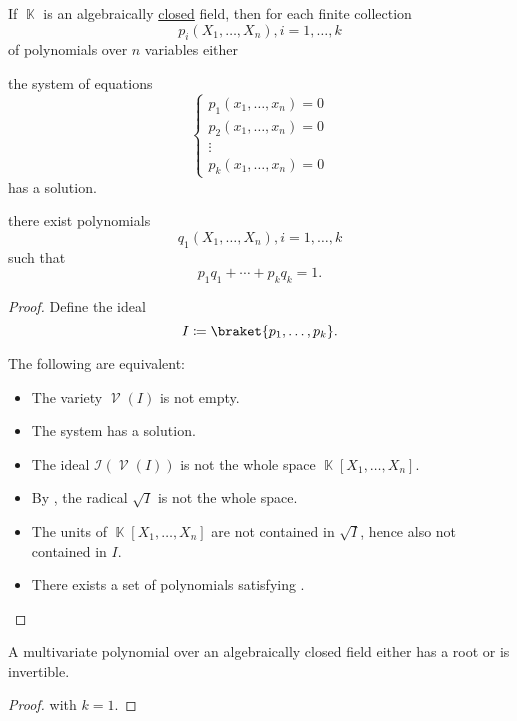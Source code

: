 \begin{corollary}\label{thm:weak_nullstellensatz}\mcite\cite{Tao:nullstellensatz}
  If \( \BbbK \) is an algebraically \hyperref[def:algebraically_closed_field]{closed} field, then for each finite collection
  \begin{equation*}
    p_i(X_1, \ldots, X_n), i = 1, \ldots, k
  \end{equation*}
  of polynomials over \( n \) variables either
  \begin{thmenum}
     the system of equations
    \begin{equation}\label{thm:weak_nullstellensatz/system}
      \begin{cases}
        p_1(x_1, \ldots, x_n) = 0 \\
        p_2(x_1, \ldots, x_n) = 0 \\
        \vdots                    \\
        p_k(x_1, \ldots, x_n) = 0
      \end{cases}
    \end{equation}
    has a solution.

     there exist polynomials
    \begin{equation*}
      q_1(X_1, \ldots, X_n), i = 1, \ldots, k
    \end{equation*}
    such that
    \begin{equation*}
      p_1 q_1 + \cdots + p_k q_k = 1.
    \end{equation*}
  \end{thmenum}
\end{corollary}
\begin{proof}
  Define the ideal
  \begin{equation*}
    I \coloneqq \braket{p_1, \ldots, p_k}.
  \end{equation*}

  The following are equivalent:
  \begin{itemize}
    \item The variety \( \mscrV(I) \) is not empty.
    \item The system  has a solution.
    \item The ideal \( \mathcal{I}(\mscrV(I)) \) is not the whole space \( \BbbK[X_1, \ldots, X_n] \).
    \item By , the radical \( \sqrt I \) is not the whole space.
    \item The units of \( \BbbK[X_1, \ldots, X_n] \) are not contained in \( \sqrt I \), hence also not contained in \( I \).
    \item There exists a set of polynomials satisfying .
  \end{itemize}
\end{proof}

\begin{corollary}\label{thm:polynomial_over_closed_field_is_either_invertible_or_has_root}
  A multivariate polynomial over an algebraically closed field either has a root or is invertible.
\end{corollary}
\begin{proof}
   with \( k = 1 \).
\end{proof}
